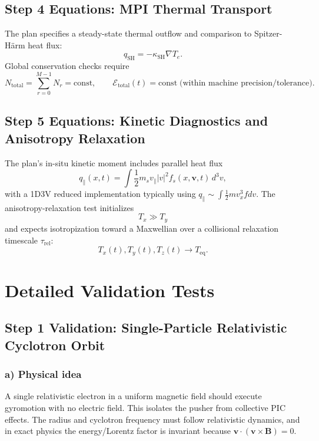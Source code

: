 \documentclass[11pt,a4paper]{article}
\begin{document}
\subsection{Step 4 Equations: MPI Thermal Transport}
The plan specifies a steady-state thermal outflow and comparison to Spitzer-H\"arm heat flux:
\begin{equation}
q_{\mathrm{SH}} = -\kappa_{\mathrm{SH}}\nabla T_e.
\end{equation}
Global conservation checks require
\begin{equation}
N_{\mathrm{total}}=\sum_{r=0}^{M-1}N_r=\mathrm{const},\qquad
\mathcal{E}_{\mathrm{total}}(t)=\mathrm{const}\;\text{(within machine precision/tolerance)}.
\end{equation}

\subsection{Step 5 Equations: Kinetic Diagnostics and Anisotropy Relaxation}
The plan's in-situ kinetic moment includes parallel heat flux
\begin{equation}
q_\parallel(x,t)=\int \frac{1}{2}m_s v_\parallel |v|^2 f_s(x,\mathbf{v},t)\,d^3v,
\end{equation}
with a 1D3V reduced implementation typically using $q_\parallel\sim\int \frac{1}{2}m v_x^3 f dv$. The anisotropy-relaxation test initializes
\begin{equation}
T_x \gg T_y
\end{equation}
and expects isotropization toward a Maxwellian over a collisional relaxation timescale $\tau_{\mathrm{rel}}$:
\begin{equation}
T_x(t),T_y(t),T_z(t)\rightarrow T_{\mathrm{eq}}.
\end{equation}

\section{Detailed Validation Tests}

\subsection{Step 1 Validation: Single-Particle Relativistic Cyclotron Orbit}

\subsubsection*{a) Physical idea}
A single relativistic electron in a uniform magnetic field should execute gyromotion with no electric field. This isolates the pusher from collective PIC effects. The radius and cyclotron frequency must follow relativistic dynamics, and in exact physics the energy/Lorentz factor is invariant because $\mathbf{v}\cdot(\mathbf{v}\times\mathbf{B})=0$.
\end{document}
